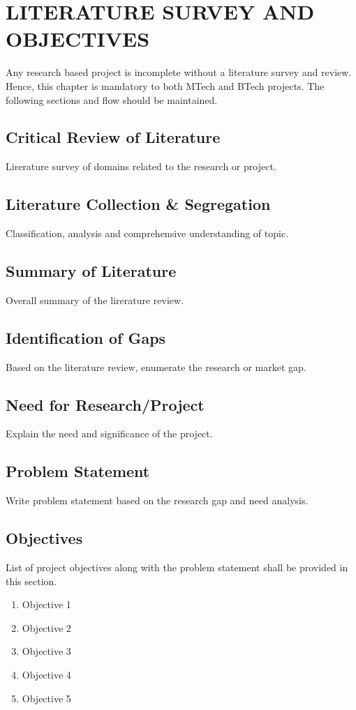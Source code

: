 
\chapter{LITERATURE SURVEY AND OBJECTIVES} %
\label{ChapterLiteratureSurvey} %

Any research based project is incomplete without a literature survey and review. Hence, this chapter is mandatory to both MTech and BTech projects.  The following sections and flow should be maintained. 

\section{Critical Review of Literature}
Lirerature survey of domains related to the research or project.

\section{Literature Collection \& Segregation}
Classification, analysis and comprehensive understanding of topic.

\section{Summary of Literature}
Overall summary of the lirerature review.

\section{Identification of Gaps}
Based on the literature review, enumerate the research  or market gap. 

\section{Need for Research/Project}
Explain the need and significance of the project.

\section{Problem Statement}
Write problem statement based on the research gap and need analysis. 

\section{Objectives}
List of project objectives along with the problem statement shall be provided in this section.
\begin{enumerate}
	\item Objective 1
	\item Objective 2
	\item Objective 3
	\item Objective 4
	\item Objective 5
\end{enumerate}

